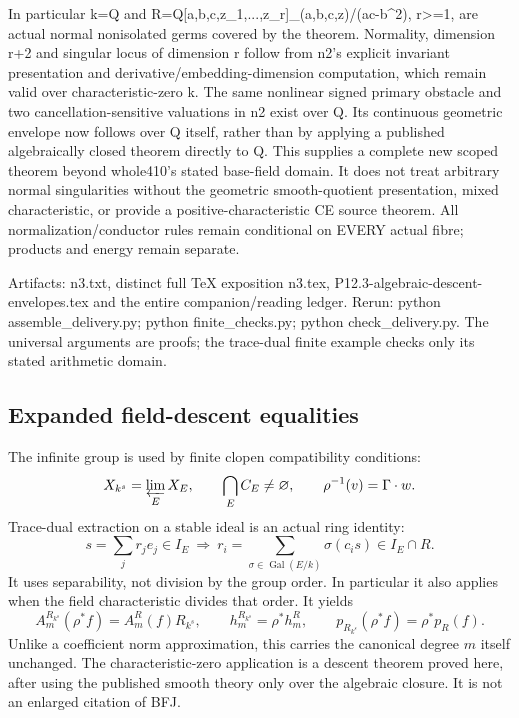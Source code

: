 In particular k=Q and R=Q[a,b,c,z\_1,...,z\_r]\_(a,b,c,z)/(ac-b\textasciicircum{}2), r\textgreater{}=1, are actual normal nonisolated germs covered by the theorem. Normality, dimension r+2 and singular locus of dimension r follow from n2's explicit invariant presentation and derivative/embedding-dimension computation, which remain valid over characteristic-zero k. The same nonlinear signed primary obstacle and two cancellation-sensitive valuations in n2 exist over Q. Its continuous geometric envelope now follows over Q itself, rather than by applying a published algebraically closed theorem directly to Q. This supplies a complete new scoped theorem beyond whole410's stated base-field domain. It does not treat arbitrary normal singularities without the geometric smooth-quotient presentation, mixed characteristic, or provide a positive-characteristic CE source theorem. All normalization/conductor rules remain conditional on EVERY actual fibre; products and energy remain separate.

Artifacts: n3.txt, distinct full TeX exposition n3.tex, P12.3-algebraic-descent-envelopes.tex and the entire companion/reading ledger. Rerun: python assemble\_delivery.py; python finite\_checks.py; python check\_delivery.py. The universal arguments are proofs; the trace-dual finite example checks only its stated arithmetic domain.

\subsection*{Expanded field-descent equalities}
The infinite group is used by finite clopen compatibility conditions:
\[
 X_{k^s}=\varprojlim_E X_E,\qquad
 \bigcap_E C_E\ne\varnothing,\qquad
 \rho^{-1}(v)=\Gamma\cdot w.
\]
Trace-dual extraction on a stable ideal is an actual ring identity:
\[
 s=\sum_jr_je_j\in I_E\ \Longrightarrow\
 r_i=\sum_{\sigma\in\operatorname{Gal}(E/k)}\sigma(c_is)
 \in I_E\cap R.
\]
It uses separability, not division by the group order. In particular it
also applies when the field characteristic divides that order. It yields
\[
 A_m^{R_{k^s}}(\rho^*f)=A_m^R(f)R_{k^s},\qquad
 h_m^{R_{k^s}}=\rho^*h_m^R,\qquad
 p_{R_{k^s}}(\rho^*f)=\rho^*p_R(f).
\]
Unlike a coefficient norm approximation, this carries the canonical
degree $m$ itself unchanged. The characteristic-zero application is a
descent theorem proved here, after using the published smooth theory
only over the algebraic closure. It is not an enlarged citation of BFJ.


